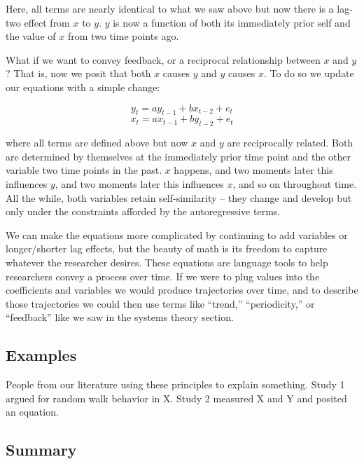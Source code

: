 \documentclass[english,,man]{apa6}
\theoremstyle{definition}
\theoremstyle{definition}
\theoremstyle{definition}
\theoremstyle{remark}
\begin{document}
\noindent Here, all terms are nearly identical to what we saw above but
now there is a lag-two effect from \(x\) to \(y\). \(y\) is now a
function of both its immediately prior self and the value of \(x\) from
two time points ago.

What if we want to convey feedback, or a reciprocal relationship between
\(x\) and \(y\)? That is, now we posit that both \(x\) causes \(y\) and
\(y\) causes \(x\). To do so we update our equations with a simple
change:

\begin{equation}
\label{sysy3}
y_{t} = a y_{t - 1} + b x_{t - 2} + e_{t}
\end{equation} \begin{equation}
\label{sysx3}
x_{t} = a x_{t - 1} + b y_{t - 2} + e_{t}
\end{equation}

\noindent where all terms are defined above but now \(x\) and \(y\) are
reciprocally related. Both are determined by themselves at the
immediately prior time point and the other variable two time points in
the past. \(x\) happens, and two moments later this influences \(y\),
and two moments later this influences \(x\), and so on throughout time.
All the while, both variables retain self-similarity -- they change and
develop but only under the constraints afforded by the autoregressive
terms.

We can make the equations more complicated by continuing to add
variables or longer/shorter lag effects, but the beauty of math is its
freedom to capture whatever the researcher desires. These equations are
language tools to help researchers convey a process over time. If we
were to plug values into the coefficients and variables we would produce
trajectories over time, and to describe those trajectories we could then
use terms like \enquote{trend,} \enquote{periodicity,} or
\enquote{feedback} like we saw in the systems theory section.

\hypertarget{examples-1}{%
\subsection{Examples}\label{examples-1}}

People from our literature using these principles to explain something.
Study 1 argued for random walk behavior in X. Study 2 measured X and Y
and posited an equation.

\hypertarget{summary-3}{%
\subsection{Summary}\label{summary-3}}
\end{document}
